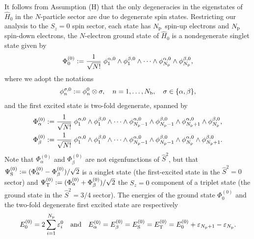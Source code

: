 \documentclass[11pt]{article}
\begin{document}
It follows from Assumption (H) that the only degeneracies in the eigenstates of $\widehat H_0$ in the $N$-particle sector are due to degenerate spin states. Restricting our analysis to the $S_z=0$ spin sector, each state has $N_{\rm p}$ spin-up electrons and $N_{\rm p}$ spin-down electrons, the $N$-electron ground state of $\widehat H_0$ is a nondegenerate singlet state given by 
\begin{equation}
\Phi_0^{(0)}:= \frac{1}{\sqrt{N!}} \;  \phi_1^{\alpha,0}\wedge \phi_1^{\beta,0} \wedge \cdots \wedge \phi_{N_{\rm p}}^{\alpha,0} \wedge \phi_{N_{\rm p}}^{\beta,0},
\label{eqn:FCI ground state}
\end{equation}
where we adopt the notations 
$$\phi_n^{\sigma,0}:=\phi_n^0\otimes\sigma,\quad n=1,\ldots,N_{\rm b},\quad\sigma\in\{\alpha,\beta\},$$
and the first excited state is two-fold degenerate, spanned by
\begin{align*}
\Phi^{(0)}_\alpha &:= \frac{1}{\sqrt{N!}} \;  \phi_1^{\alpha,0} \wedge \phi_1^{\beta,0} \wedge \cdots \wedge \phi_{N_{\rm p}-1}^{\alpha,0} \wedge \phi_{N_{\rm p}-1}^{\beta,0} \wedge \phi_{N_{\rm p}+1}^{\alpha,0} \wedge \phi_{N_{\rm p}}^{\beta,0}, \\
\Phi^{(0)}_\beta &:= \frac{1}{\sqrt{N!}} \;  \phi_1^{\alpha,0} \wedge \phi_1^{\beta,0} \wedge \cdots \wedge \phi_{N_{\rm p}-1}^{\alpha,0} \wedge \phi_{N_{\rm p}-1}^{\beta,0}  \wedge \phi_{N_{\rm p}}^{\alpha,0} \wedge \phi_{N_{\rm p}+1}^{\beta,0}.
\end{align*}
Note that $\Phi^{(0)}_\alpha$ and $\Phi^{(0)}_\beta$ are not eigenfunctions of $\hat{S}^2$, but that 
$\Psi_{\rm S}^{(0)}:=(\Phi^{(0)}_\alpha-\Phi^{(0)}_\beta)/\sqrt 2$ is a singlet state (the first-excited state in the $\hat{S}^2=0$ sector) and $\Psi_{\rm T}^{(0)}:=(\Phi^{(0)}_\alpha+\Phi^{(0)}_\beta)/\sqrt 2$ the $S_z=0$ component of a triplet state (the ground state in the $\hat{S}^2=3/4$ sector). The energies of the ground state $\Phi^{(0)}_0$ and the two-fold degenerate first excited state are respectively
$$
E^{(0)}_0 = 2\sum_{i=1}^{N_{\rm p}} \varepsilon_i^0 \quad \mbox{and} \quad 
E^{(0)}_\alpha = E^{(0)}_\beta = E^{(0)}_{\rm S} = E^{(0)}_{\rm T}  = E^{(0)}_0 + \varepsilon_{N_{\rm p}+1} - \varepsilon_{N_{\rm p}}.
$$

\medskip
\end{document}
